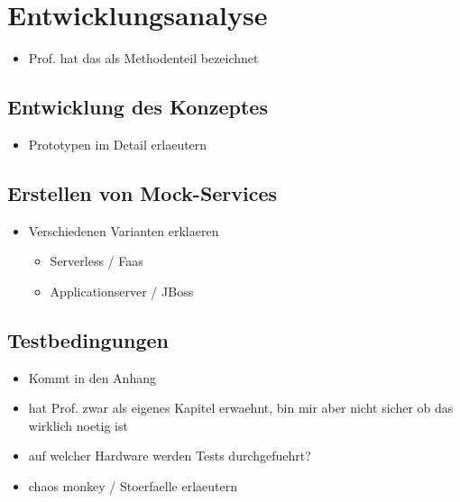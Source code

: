 \chapter{Entwicklungsanalyse}
\begin{itemize}
  \item Prof. hat das als Methodenteil bezeichnet
\end{itemize}

\section{Entwicklung des Konzeptes}
\begin{itemize}
  \item Prototypen im Detail erlaeutern
\end{itemize}

\section{Erstellen von Mock-Services}
\begin{itemize}
  \item Verschiedenen Varianten erklaeren
	\begin{itemize}
	  \item Serverless / Faas
	  \item Applicationserver / JBoss
	\end{itemize}
\end{itemize}

\section{Testbedingungen}
\begin{itemize}
  \item Kommt in den Anhang
  \item hat Prof. zwar als eigenes Kapitel erwaehnt, bin mir aber nicht sicher ob das wirklich noetig ist
  \item auf welcher Hardware werden Tests durchgefuehrt?
  \item chaos monkey / Stoerfaelle erlaeutern
\end{itemize}

